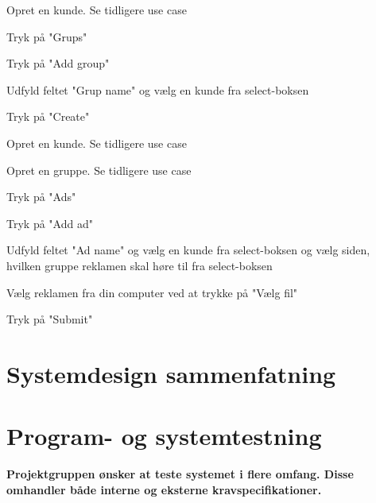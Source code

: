 \documentclass[a4paper,12pt]{article}
\begin{document}
\begin{usecase}
 {
	\item Opret en kunde. Se tidligere use case
	\item Tryk på "Grups"
	\item Tryk på "Add group"
	\item Udfyld feltet "Grup name" og vælg en kunde fra select-boksen
	\item Tryk på "Create"
}
\end{usecase}

\begin{usecase}
 {
	\item Opret en kunde. Se tidligere use case
	\item Opret en gruppe. Se tidligere use case
	\item Tryk på "Ads"
	\item Tryk på "Add ad"
	\item Udfyld feltet "Ad name" og vælg en kunde fra select-boksen og vælg siden, hvilken gruppe reklamen skal høre til fra select-boksen
	\item Vælg reklamen fra din computer ved at trykke på "Vælg fil"
	\item Tryk på "Submit"
}
\end{usecase}


\section{Systemdesign sammenfatning}

\section{Program- og systemtestning}

\textbf{Projektgruppen ønsker at teste systemet i flere omfang. Disse omhandler både interne og eksterne kravspecifikationer.}
\end{document}
